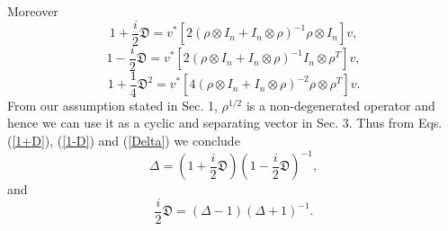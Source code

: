  Moreover
	\begin{equation} \label{1+D} 
    1+\frac{i}{2}\mathfrak{D}=v^\ast [ 2(\rho\otimes I_n+I_n\otimes \rho)^{-1}  \rho \otimes I_n]v,
    \end{equation}
    \begin{equation}\label{1-D}
    1-\frac{i}{2}\mathfrak{D}=v^\ast [ 2(\rho\otimes I_n+I_n\otimes \rho)^{-1}I_n \otimes \rho^T]v,
    \end{equation}
    \begin{equation}
    1+\frac{1}{4}\mathfrak{D}^2=v^\ast[ 4(\rho\otimes I_n+I_n\otimes \rho)^{-2}\rho \otimes \rho^T]v.
	\end{equation}
From our assumption stated in Sec. 1,
$\rho^{1/2}$ is a non-degenerated operator and hence we can use it as a 
cyclic and separating vector in Sec. 3.
Thus from Eqs. (\ref{1+D}), (\ref{1-D}) and (\ref{Delta})  we conclude
		$$
    \Delta=\left(1+\frac{i}{2}\mathfrak{D}\right)\left(1-\frac{i}{2}\mathfrak{D}\right)^{-1},
		$$
		and
		$$
     \frac{i}{2}\mathfrak{D}=(\Delta-1)(\Delta+1)^{-1}.
		$$


